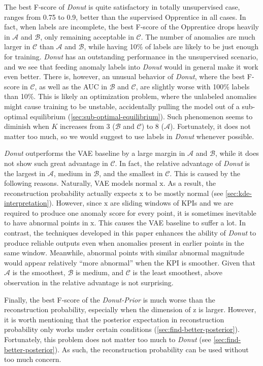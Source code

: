 \documentclass[sigconf]{acmart}
\newcommand{\DONUT}{\textit{Donut}}
\newcommand{\DATASETA}{$\mathcal{A}$}
\newcommand{\DATASETB}{$\mathcal{B}$}
\newcommand{\DATASETC}{$\mathcal{C}$}
\newcommand{\vv}[1]{\bm{\mathrm{{#1}}}}
\begin{document}
The best F-score of \DONUT{} is quite satisfactory in totally unsupervised case, ranges from 0.75 to 0.9, better than the supervised Opprentice in all cases.
In fact, when labels are incomplete, the best F-score of the Opprentice drops heavily in \DATASETA{} and \DATASETB{}, only remaining acceptable in \DATASETC{}.
The number of anomalies are much larger in \DATASETC{} than \DATASETA{} and \DATASETB{}, while having 10\% of labels are likely to be just enough for training.
\DONUT{} has an outstanding performance in the unsupervised scenario, and we see that feeding anomaly labels into \DONUT{} would in general make it work even better.
There is, however, an unusual behavior of \DONUT{}, where the best F-score in \DATASETC{}, as well as the AUC in \DATASETB{} and \DATASETC{}, are slightly worse with 100\% labels than 10\%.
This is likely an optimization problem, where the unlabeled anomalies might cause training to be unstable, accidentally pulling the model out of a sub-optimal equilibrium (\cref{sec:sub-optimal-equilibrium}).
Such phenomenon seems to diminish when $K$ increases from 3 (\DATASETB{} and \DATASETC{}) to 8 (\DATASETA{}).
Fortunately, it does not matter too much, so we would suggest to use labels in \DONUT{} whenever possible.

\DONUT{} outperforms the VAE baseline by a large margin in \DATASETA{} and \DATASETB{}, while it does not show such great advantage in \DATASETC{}.
In fact, the relative advantage of \DONUT{} is the largest in \DATASETA{}, medium in \DATASETB{}, and the smallest in \DATASETC{}.
This is caused by the following reasons.
Naturally, VAE models normal $\vv{x}$.
As a result, the reconstruction probability actually expects $\vv{x}$ to be mostly normal (see \cref{sec:kde-interpretation}).
However, since $\vv{x}$ are sliding windows of KPIs and we are required to produce one anomaly score for every point, it is sometimes inevitable to have abnormal points in $\vv{x}$.
This causes the VAE baseline to suffer a lot.
In contrast, the techniques developed in this paper enhances the ability of \DONUT{} to produce reliable outputs even when anomalies present in earlier points in the same window.
Meanwhile,  abnormal points with similar abnormal magnitude would appear relatively ``more abnormal'' when the KPI is smoother.
Given that \DATASETA{} is the smoothest, \DATASETB{} is medium, and \DATASETC{} is the least smoothest, above observation in the relative advantage is not surprising.

Finally, the best F-score of the \textit{Donut-Prior} is much worse than the reconstruction probability, especially when the dimension of $\vv{z}$ is larger.
However, it is worth mentioning that the posterior expectation in reconstruction probability only works under certain conditions (\cref{sec:find-better-posterior}).
Fortunately, this problem does not matter too much to  \DONUT{} (see \cref{sec:find-better-posterior}). As such, the reconstruction probability can be used without too much concern.
\end{document}
